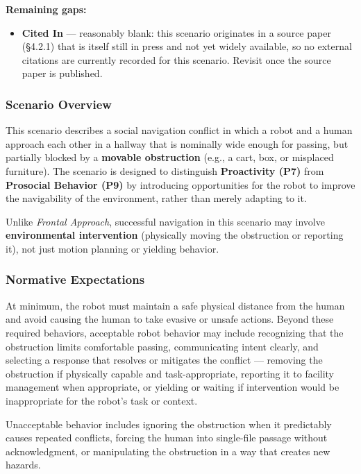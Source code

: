 \documentclass[utf8]{frontiers_suppmat} %
\providecommand{\tightlist}{%
  \setlength{\itemsep}{0pt}\setlength{\parskip}{0pt}}
\begin{document}
\textbf{Remaining gaps:}

\begin{itemize}
\tightlist
\item
  \textbf{Cited In} --- reasonably blank: this scenario originates in a
  source paper (§4.2.1) that is itself still in press and not yet widely
  available, so no external citations are currently recorded for this
  scenario. Revisit once the source paper is published.
\end{itemize}

\subsubsection{Scenario Overview}\label{scenario-overview}

This scenario describes a social navigation conflict in which a robot
and a human approach each other in a hallway that is nominally wide
enough for passing, but partially blocked by a \textbf{movable
obstruction} (e.g., a cart, box, or misplaced furniture). The scenario
is designed to distinguish \textbf{Proactivity (P7)} from
\textbf{Prosocial Behavior (P9)} by introducing opportunities for the
robot to improve the navigability of the environment, rather than merely
adapting to it.

Unlike \emph{Frontal Approach}, successful navigation in this scenario
may involve \textbf{environmental intervention} (physically moving the
obstruction or reporting it), not just motion planning or yielding
behavior.

\subsubsection{Normative Expectations}\label{normative-expectations}

At minimum, the robot must maintain a safe physical distance from the
human and avoid causing the human to take evasive or unsafe actions.
Beyond these required behaviors, acceptable robot behavior may include
recognizing that the obstruction limits comfortable passing,
communicating intent clearly, and selecting a response that resolves or
mitigates the conflict --- removing the obstruction if physically
capable and task-appropriate, reporting it to facility management when
appropriate, or yielding or waiting if intervention would be
inappropriate for the robot's task or context.

Unacceptable behavior includes ignoring the obstruction when it
predictably causes repeated conflicts, forcing the human into
single-file passage without acknowledgment, or manipulating the
obstruction in a way that creates new hazards.
\end{document}
